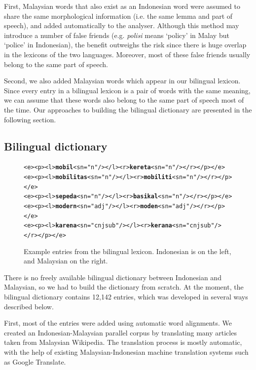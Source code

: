 \documentclass[10pt,a5paper,twoside]{article}
\begin{document}
First, Malaysian words that also exist as an Indonesian word were assumed to share the same morphological information (i.e. the same lemma and part of speech), and added automatically to the analyser. Although this method may introduce a number of false friends (e.g. \emph{polisi} means `policy' in Malay but `police' in Indonesian), the benefit outweighs the risk since there is huge overlap in the lexicons of the two languages. Moreover, most of these false friends usually belong to the same part of speech.

Second, we also added Malaysian words which appear in our bilingual lexicon. Since every entry in a bilingual lexicon is a pair of words with the same meaning, we can assume that these words also belong to the same part of speech most of the time. Our approaches to building the bilingual dictionary are presented in the following section.

\subsection{Bilingual dictionary}

\begin{figure}[htbp]
\begin{center}
\begin{small}
\begin{alltt}
<e><p><l>\textbf{mobil}<s n="n"/></l><r>\textbf{kereta}<s n="n"/></r></p></e>
<e><p><l>\textbf{mobilitas}<s n="n"/></l><r>\textbf{mobiliti}<s n="n"/></r></p></e>
<e><p><l>\textbf{sepeda}<s n="n"/></l><r>\textbf{basikal}<s n="n"/></r></p></e>
<e><p><l>\textbf{modern}<s n="adj"/></l><r>\textbf{moden}<s n="adj"/></r></p></e>
<e><p><l>\textbf{karena}<s n="cnjsub"/></l><r>\textbf{kerana}<s n="cnjsub"/></r></p></e>
\end{alltt}
\end{small}
\caption{Example entries from the bilingual lexicon. Indonesian is on the left, and Malaysian on the right.}
\label{fig:bidix}
\end{center}
\end{figure}

There is no freely available bilingual dictionary between Indonesian and Malaysian, so we had to build the dictionary from scratch. At the moment, the bilingual dictionary contains 12,142 entries, which was developed in several ways described below.

First, most of the entries were added using automatic word alignments. We created an Indonesian-Malaysian parallel corpus by translating many articles taken from Malaysian Wikipedia. The translation process is mostly automatic, with the help of existing Malaysian-Indonesian machine translation systems such as Google Translate.
\end{document}
